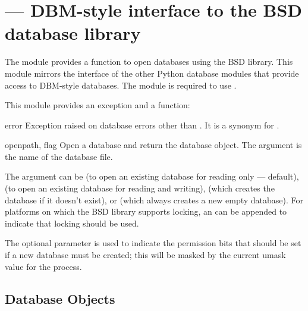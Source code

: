 \section{ ---
         DBM-style interface to the BSD database library}



The  module provides a function to open databases using
the BSD  library.  This module mirrors the interface of the
other Python database modules that provide access to DBM-style
databases.  The  module is required 
to use .

This module provides an exception and a function:


\begin{excdesc}{error}
  Exception raised on database errors other than
  .  It is a synonym for .
\end{excdesc}

\begin{funcdesc}{open}{path, flag}
  Open a  database and return the database object.  The
   argument is the name of the database file.

  The  argument can be
   (to open an existing database for reading only --- default),
   (to open an existing database for reading and writing),
   (which creates the database if it doesn't exist), or
   (which always creates a new empty database).
  For platforms on which the BSD  library supports locking,
  an  can be appended to indicate that locking should be
  used.

  The optional  parameter is used to indicate the \UNIX{}
  permission bits that should be set if a new database must be
  created; this will be masked by the current umask value for the
  process.
\end{funcdesc}


\begin{seealso}
\end{seealso}


\subsection{Database Objects \label{dbhash-objects}}

